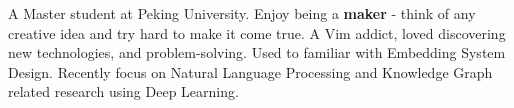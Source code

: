 

\begin{cvparagraph}

A Master student at Peking University. Enjoy being a \textbf{maker} - think of any creative idea and try hard to make it come true. A Vim addict, loved discovering new technologies, and problem-solving. Used to familiar with Embedding System Design. Recently focus on Natural Language Processing and Knowledge Graph related research using Deep Learning.
\end{cvparagraph}
